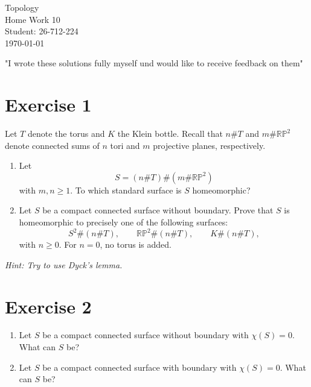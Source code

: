 \documentclass[12pt]{article}
\begin{document}
\begin{titlepage}
\centering
\vspace*{\fill}
{\Huge Topology} \\[0.5cm]
{\Huge Home Work 10}\\[1.5cm]
{\Large Student: 26-712-224}\\[0.5cm]
{\Large \today}\par

\vspace{2cm}
{\normalsize "I wrote these solutions fully myself und would like to receive feedback on them"\par}

\vspace*{\fill}
\end{titlepage}

\newpage

\section*{Exercise 1}

Let $T$ denote the torus and $K$ the Klein bottle.
Recall that $n\#T$ and $m\#\mathbb{RP}^2$ denote
connected sums of $n$ tori and $m$ projective planes,
respectively.

\begin{enumerate}
\item[(i)] Let
\[
S=(n\#T)\#(m\#\mathbb{RP}^2)
\]
with $m,n\geq 1$.
To which standard surface is $S$ homeomorphic?

\item[(ii)] Let $S$ be a compact connected surface
without boundary. Prove that $S$ is homeomorphic
to precisely one of the following surfaces:
\[
S^2\#(n\#T),\qquad
\mathbb{RP}^2\#(n\#T),\qquad
K\#(n\#T),
\]
with $n\geq 0$. For $n=0$, no torus is added.
\end{enumerate}

\noindent\textit{Hint: Try to use Dyck's lemma.}

\newpage

\section*{Exercise 2}

\begin{enumerate}
\item[(i)] Let $S$ be a compact connected surface
without boundary with $\chi(S)=0$.
What can $S$ be?

\item[(ii)] Let $S$ be a compact connected surface
with boundary with $\chi(S)=0$.
What can $S$ be?
\end{enumerate}
\end{document}
